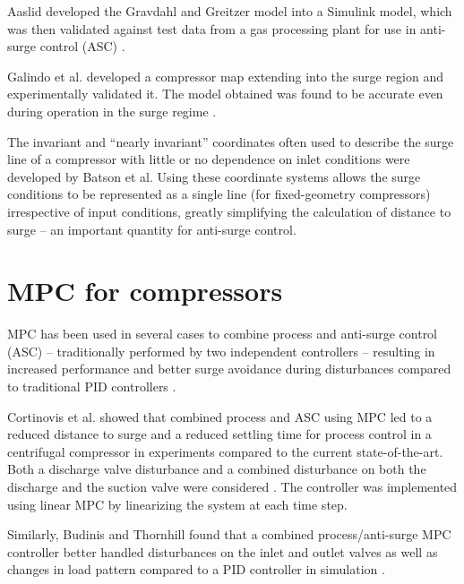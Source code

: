 Aaslid developed the Gravdahl and Greitzer model into a Simulink model, which was then validated against test data from a gas processing plant for use in anti-surge control (ASC) \cite{Aaslid2009}. 

Galindo et al. developed a compressor map extending into the surge region and experimentally validated it. The model obtained was found to be accurate even during operation in the surge regime \cite{Galindo2008}.

The invariant and ``nearly invariant'' coordinates often used to describe the surge line of a compressor with little or no dependence on inlet conditions were developed by Batson et al. \cite{Batson1996}
Using these coordinate systems allows the surge conditions to be represented as a single line (for fixed-geometry compressors) irrespective of input conditions, greatly simplifying the calculation of distance to surge -- an important quantity for anti-surge control.



\section{MPC for compressors}
MPC has been used in several cases to combine process and anti-surge control (ASC) -- traditionally performed by two independent controllers -- resulting in increased performance and better surge avoidance during disturbances compared to traditional PID controllers \cite{Cortinovis2015,Budinis2015}.

Cortinovis et al. showed that combined process and ASC using MPC led to a reduced distance to surge and a reduced settling time for process control in a centrifugal compressor in experiments compared to the current state-of-the-art. 
Both a discharge valve disturbance and a combined disturbance on both the discharge and the suction valve were considered \cite{Cortinovis2015}. 
The controller was implemented using linear MPC by linearizing the system at each time step. 

Similarly, Budinis and Thornhill found that a combined process/anti-surge MPC controller better handled disturbances on the inlet and outlet valves as well as changes in load pattern compared to a PID controller in simulation \cite{Budinis2015}.


